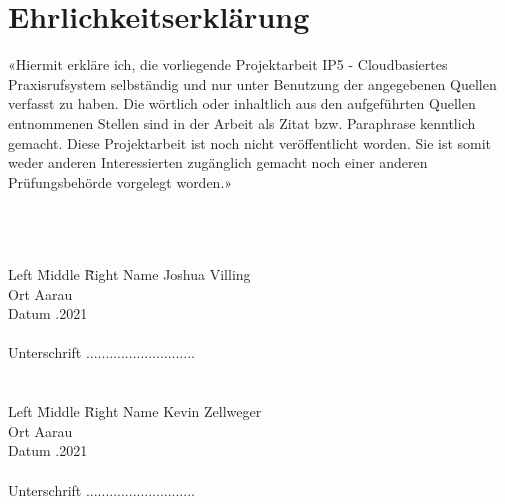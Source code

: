 \clearpage
\section{Ehrlichkeitserklärung}

«Hiermit erkläre ich, die vorliegende Projektarbeit IP5 - Cloudbasiertes Praxisrufsystem selbständig und nur unter Benutzung der angegebenen Quellen verfasst zu haben.
Die wörtlich oder inhaltlich aus den aufgeführten Quellen entnommenen Stellen sind in der Arbeit als Zitat bzw. Paraphrase kenntlich gemacht.
Diese Projektarbeit ist noch nicht veröffentlicht worden.
Sie ist somit weder anderen Interessierten zugänglich gemacht noch einer anderen Prüfungsbehörde vorgelegt worden.»

\begin{tabbing}
    \\
    \\
    \\
    Left \= Middle \=  \= Right \kill
    Name \> \> \>    Joshua Villing\\
    Ort \> \> \>    Aarau \\
    Datum \> \> .2021\\
    \\
    Unterschrift \> \> \>     ............................\\
    \\
    \\
    Left \= Middle \= Right \kill
    Name \> \> \>    Kevin Zellweger\\
    Ort \> \>\>    Aarau\\
    Datum \> \> .2021\\
    \\
    Unterschrift \> \> \>    ............................\\
\end{tabbing}
